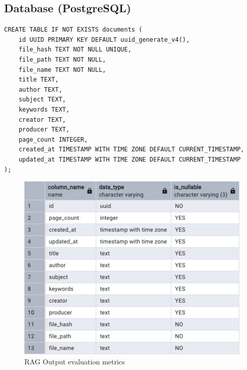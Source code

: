 \subsection{Database (PostgreSQL)}
\label{subsec:AppDesignModules-DatabasePSQL}
\begin{lstlisting}
CREATE TABLE IF NOT EXISTS documents (
    id UUID PRIMARY KEY DEFAULT uuid_generate_v4(),
    file_hash TEXT NOT NULL UNIQUE,
    file_path TEXT NOT NULL,
    file_name TEXT NOT NULL,
    title TEXT,
    author TEXT,
    subject TEXT,
    keywords TEXT,
    creator TEXT,
    producer TEXT,
    page_count INTEGER,
    created_at TIMESTAMP WITH TIME ZONE DEFAULT CURRENT_TIMESTAMP,
    updated_at TIMESTAMP WITH TIME ZONE DEFAULT CURRENT_TIMESTAMP
);
\end{lstlisting}
\begin{figure}[H]
    \centering
    \includegraphics[width=1.0\linewidth]{images/dbtable-documents.png}
    \caption{RAG Output evaluation metrics ~\cite{cardenas2023rag}}
    \label{fig:autoregressive_decoding}
\end{figure}


